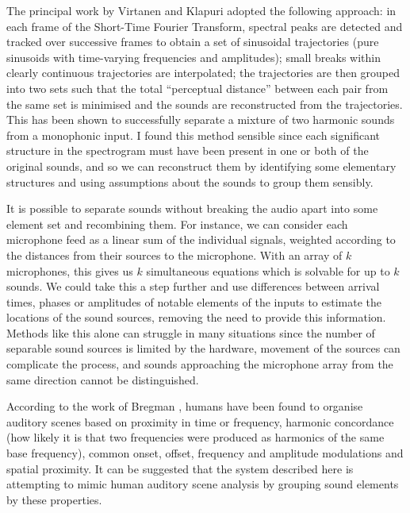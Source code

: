 \documentclass[12pt,a4paper,twoside,openright]{report}
\begin{document}
{\color{red}The principal work by Virtanen and Klapuri \cite{virtanen2000separation} adopted the following approach: in each frame of the Short-Time Fourier Transform, spectral peaks are detected and tracked over successive frames to obtain a set of sinusoidal trajectories (pure sinusoids with time-varying frequencies and amplitudes);} small breaks within clearly continuous trajectories are interpolated; the trajectories are then grouped into two sets such that the total ``perceptual distance'' between each pair from the same set is minimised and the sounds are reconstructed from the trajectories. This has been shown to successfully separate a mixture of two harmonic sounds from a monophonic input. I found this method sensible since each significant structure in the spectrogram must have been present in one or both of the original sounds, and so we can reconstruct them by identifying some elementary structures and using assumptions about the sounds to group them sensibly.


It is possible to separate sounds without breaking the audio apart into some element set and recombining them. For instance, we can consider each microphone feed as a linear sum of the individual signals, weighted according to the distances from their sources to the microphone. With an array of $ k $ microphones, this gives us $ k $ simultaneous equations which is solvable for up to $ k $ sounds. We could take this a step further and use differences between arrival times, phases or amplitudes of notable elements of the inputs to estimate the locations of the sound sources, removing the need to provide this information. Methods like this alone can struggle in many situations since the number of separable sound sources is limited by the hardware, movement of the sources can complicate the process, and sounds approaching the microphone array from the same direction cannot be distinguished.

According to the work of Bregman \cite{bregman1994auditory}, humans have been found to organise auditory scenes based on proximity in time or frequency, harmonic concordance (how likely it is that two frequencies were produced as harmonics of the same base frequency), common onset, offset, frequency and amplitude modulations and spatial proximity. It can be suggested that the system described here is attempting to mimic human auditory scene analysis by grouping sound elements by these properties.
\end{document}
